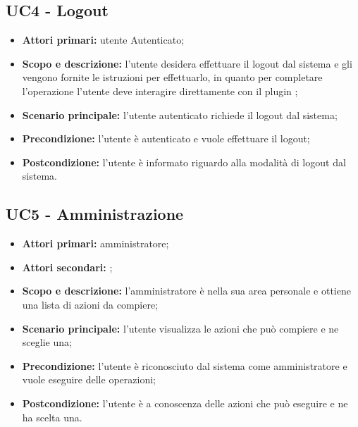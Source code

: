 \documentclass[AnalisiDeiRequisiti.tex]{subfiles}
\begin{document}
\subsection{UC4 - Logout}
\begin{itemize}
	\item \textbf{Attori primari:} utente Autenticato;
	\item \textbf{Scopo e descrizione:} l'utente desidera effettuare il logout dal sistema e gli vengono fornite le istruzioni per effettuarlo, in quanto per completare l'operazione l'utente deve interagire direttamente con il plugin ;
	\item \textbf{Scenario principale:} l'utente autenticato richiede il logout dal sistema;
	\item \textbf{Precondizione:} l'utente è autenticato e vuole effettuare il logout;
	\item \textbf{Postcondizione:} l'utente è informato riguardo alla modalità di logout dal sistema.
\end{itemize}

\subsection{UC5 - Amministrazione}
\begin{itemize}
	\item \textbf{Attori primari:} amministratore;
	\item \textbf{Attori secondari:} ;
	\item \textbf{Scopo e descrizione:} l'amministratore è nella sua area personale e ottiene una lista di azioni da compiere;
	\item \textbf{Scenario principale:} l'utente visualizza le azioni che può compiere e ne sceglie una; 
	\item \textbf{Precondizione:} l'utente è riconosciuto dal sistema come amministratore e vuole eseguire delle operazioni; 
	\item \textbf{Postcondizione:} l'utente è a conoscenza delle azioni che può eseguire e ne ha scelta una.
\end{itemize}
\end{document}
